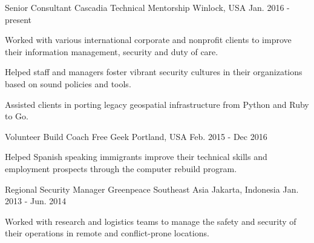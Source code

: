 

\begin{cventries}

  \cventry
    {Senior Consultant} %
    {Cascadia Technical Mentorship} %
    {Winlock, USA} %
    {Jan. 2016 - present} %
    {
      \begin{cvitems} %
        \item {Worked with various international corporate and nonprofit clients to improve their information management, security and duty of care.}
        \item {Helped staff and managers foster vibrant security cultures in their organizations based on sound policies and tools.}
        \item {Assisted clients in porting legacy geospatial infrastructure from Python and Ruby to Go.}
      \end{cvitems}
    }

  \cventry
    {Volunteer Build Coach} %
    {Free Geek} %
    {Portland, USA} %
    {Feb. 2015 - Dec 2016} %
    {
      \begin{cvitems} %
        \item {Helped Spanish speaking immigrants improve their technical skills and employment prospects through the computer rebuild program.}
      \end{cvitems}
    }

  \cventry
    {Regional Security Manager} %
    {Greenpeace Southeast Asia} %
    {Jakarta, Indonesia} %
    {Jan. 2013 - Jun. 2014} %
    {
      \begin{cvitems} %
        \item {Worked with research and logistics teams to manage the safety and security of their operations in remote and conflict-prone locations.}
      \end{cvitems}
    }


\end{cventries}
